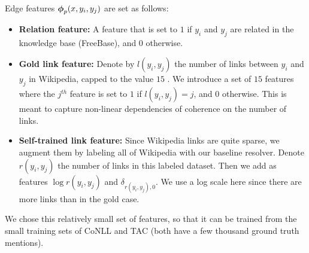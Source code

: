 Edge features $\boldsymbol{\phi}_p(x,y_i,y_j)$ are set as follows:
\begin{itemize}
\item {\bf Relation feature:} A feature that is set to $1$ if $y_i$ and $y_j$ are related in the knowledge base (FreeBase), and $0$ otherwise.
\item {\bf Gold link feature:} Denote by $l(y_i,y_j)$ the number of links between $y_i$ and $y_j$ in Wikipedia, capped to the value $15$ . We introduce a set of $15$ features where the $j^{th}$ feature is set to $1$ if $l(y_i,y_j) = j$, and $0$ otherwise. This is meant to capture non-linear dependencies of coherence
on the number of links.
\item {\bf Self-trained link feature:} Since Wikipedia links are quite sparse, we augment them by labeling all of Wikipedia with our baseline resolver. %
Denote $r(y_i,y_j)$ the number of links in this labeled dataset. Then we add as features $\log{r(y_i,y_j)}$ and $\delta_{r(y_i,y_j),0}$. We use a log scale here since there are more links than in the gold case. 
\end{itemize}
We chose this relatively small set of features, so that it can be trained from the small training sets of CoNLL and TAC (both have a few thousand ground truth mentions).